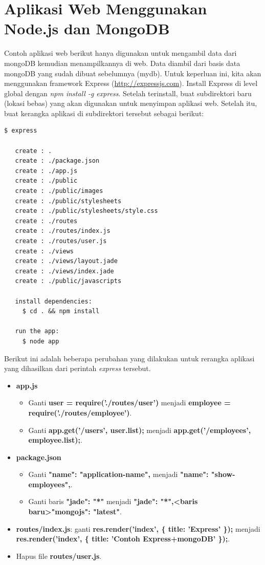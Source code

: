 \section{Aplikasi Web Menggunakan Node.js dan MongoDB}

Contoh aplikasi web berikut hanya digunakan untuk mengambil data dari mongoDB kemudian menampilkannya di web. Data diambil dari basis data mongoDB yang sudah dibuat sebelumnya (mydb). Untuk keperluan ini, kita akan menggunakan framework Express (\url{http://expressjs.com}). Install Express di level global dengan \textit{npm install -g express}. Setelah terinstall, buat subdirektori baru (lokasi bebas) yang akan digunakan untuk menyimpan aplikasi web. Setelah itu, buat kerangka aplikasi di subdirektori tersebut sebagai berikut:

\lstset{language=bash,caption=Mengakses mongoDB dari Node.js}
\begin{lstlisting}
$ express 

   create : .
   create : ./package.json
   create : ./app.js
   create : ./public
   create : ./public/images
   create : ./public/stylesheets
   create : ./public/stylesheets/style.css
   create : ./routes
   create : ./routes/index.js
   create : ./routes/user.js
   create : ./views
   create : ./views/layout.jade
   create : ./views/index.jade
   create : ./public/javascripts

   install dependencies:
     $ cd . && npm install

   run the app:
     $ node app
\end{lstlisting}

Berikut ini adalah beberapa perubahan yang dilakukan untuk rerangka aplikasi yang dihasilkan dari perintah \textit{express} tersebut.

\begin{itemize}
	\item \textbf{app.js}
		\begin{itemize}
			\item Ganti \textbf{user = require('./routes/user')} menjadi \textbf{employee = require('./routes/employee')}. 
			\item Ganti \textbf{app.get('/users', user.list);} menjadi \textbf{app.get('/employees', employee.list);}.
		\end{itemize}
	\item \textbf{package.json}
		\begin{itemize}
			\item Ganti \textbf{"name": "application-name",} menjadi \textbf{"name": "show-employees",}.
			\item Ganti baris \textbf{"jade": "*"} menjadi \textbf{"jade": "*",<baris baru>"mongojs": "latest"}.
		\end{itemize}
	\item \textbf{routes/index.js}: ganti \textbf{res.render('index', \{ title: 'Express' \});} menjadi \textbf{res.render('index', \{ title: 'Contoh Express+mongoDB' \});}.
	\item Hapus file \textbf{routes/user.js}.
\end{itemize}

